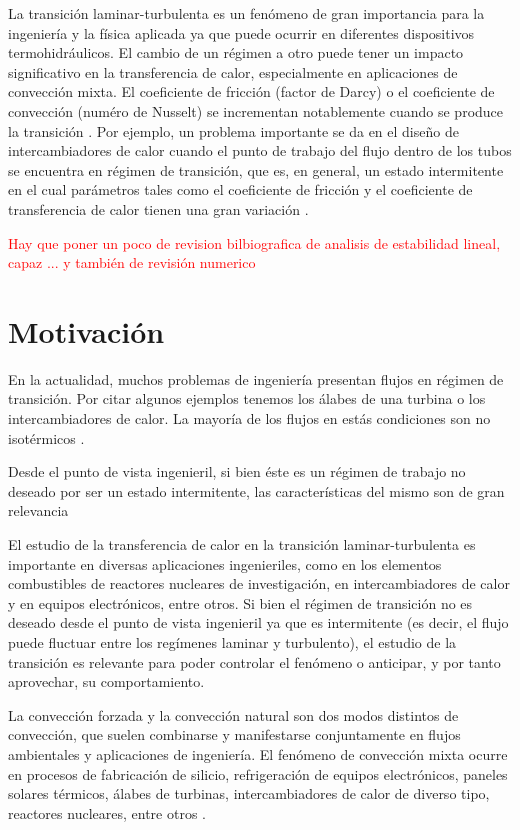 La transición laminar-turbulenta es un fenómeno de gran importancia para la ingeniería y la física aplicada ya que puede ocurrir en diferentes dispositivos termohidráulicos. El cambio de un régimen a otro puede tener un impacto significativo en la transferencia de calor, especialmente en aplicaciones de convección mixta. El coeficiente de fricción (factor de Darcy) o el coeficiente de convección (numéro de Nusselt) se incrementan notablemente cuando se produce la transición \cite{incropera,white}. Por ejemplo, un problema importante se da en el diseño de intercambiadores de calor cuando el punto de trabajo del flujo dentro de los tubos se encuentra en régimen de transición, que es, en general, un estado intermitente en el cual parámetros tales como el coeficiente de fricción y el coeficiente de transferencia de calor tienen una gran variación \cite{ghajar2019heat}.



\textcolor{red}{Hay que poner un poco de revision bilbiografica de analisis de estabilidad lineal, capaz ... y también de revisión numerico}




\section{Motivación}


En la actualidad, muchos problemas de ingeniería presentan flujos en régimen de transición. Por citar algunos ejemplos tenemos los álabes de una turbina o los intercambiadores de calor. La mayoría de los flujos en estás condiciones son no isotérmicos \cite{chen2003direct}. 

Desde el punto de vista ingenieril, si bien éste es un régimen de trabajo no deseado por ser un estado intermitente, las características del mismo son de gran relevancia


El estudio de la transferencia de calor en la transición laminar-turbulenta es importante en diversas aplicaciones ingenieriles, como en los elementos combustibles de reactores nucleares de investigación, en intercambiadores de calor y en equipos electrónicos, entre otros. Si bien el régimen de transición no es deseado desde el punto de vista ingenieril ya que es intermitente (es decir, el flujo puede fluctuar
entre los regímenes laminar y turbulento), el estudio de la transición es relevante para poder controlar el fenómeno o anticipar, y por tanto aprovechar, su comportamiento.


La convección forzada y la convección natural son dos modos distintos de convección, que suelen combinarse y manifestarse conjuntamente en flujos ambientales y aplicaciones de ingeniería. El fenómeno de convección mixta  ocurre en procesos de fabricación de silicio, refrigeración de equipos electrónicos, paneles solares térmicos, álabes de turbinas, intercambiadores de calor de diverso tipo, reactores nucleares, entre otros \cite{kasagi1997direct}. 

